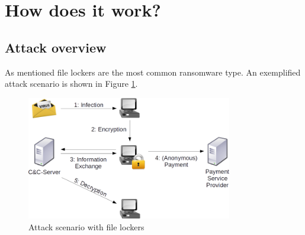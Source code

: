 \section{How does it work?}
\subsection{Attack overview}
\label{subsec:attack_overview}

As mentioned file lockers are the most common ransomware type. An exemplified attack scenario is shown in Figure \ref{fig:attack_scenario}.

\begin{figure}[htbp]
  \begin{center}
    \includegraphics[width=0.8\textwidth]{images/attack_scenario.png}
    \caption{Attack scenario with file lockers}
    \label{fig:attack_scenario}
  \end{center}
\end{figure}

